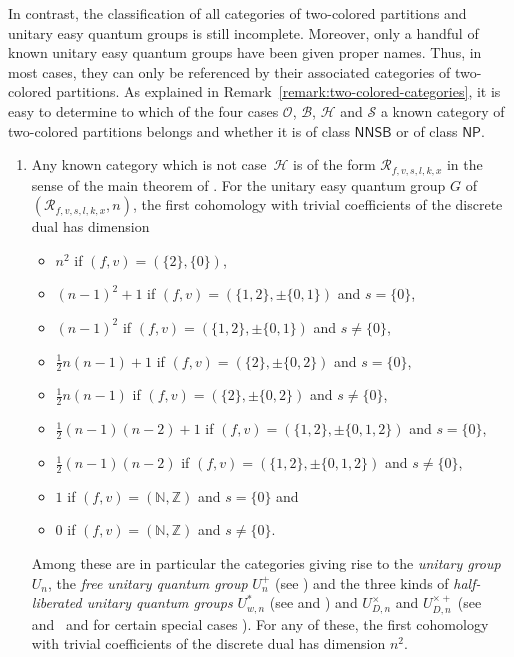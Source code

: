 \documentclass[10pt,a4paper]{amsart}
\numberwithin{equation}{section}
\newcommand{\pint}{\mathbb{N}}
\newcommand{\integers}{\mathbb{Z}}
\newcommand{\ueqgU}[1]{U_{#1}}
\newcommand{\ueqgUplus}[1]{U^{+}_{#1}}
\newcommand{\ueqgUstar}[2]{U^{\ast}_{#1,#2}}
\newcommand{\ueqgUtimes}[2]{U^{\times}_{#1,#2}}
\newcommand{\ueqgUtimesplus}[2]{U^{{\times}{+}}_{#1,#2}}
\newcommand{\thedim}{n}
\newcommand{\theqg}{G}
\newcommand{\onlyneutralnonsingletonblocks}{\mathsf{NNSB}}
\newcommand{\onlyneutralpartitions}{\mathsf{NP}}
\begin{document}
    \begin{Remark}
      In contrast, the classification of all categories of two-colored partitions and unitary easy quantum groups is still incomplete. Moreover, only a handful of known unitary easy quantum groups have been given proper names. Thus, in most cases, they can only be referenced by their associated categories of two-colored partitions.  As explained in Remark~\ref{remark:two-colored-categories}, it is easy to determine to which of the four cases $\mathcal{O}$, $\mathcal{B}$, $\mathcal{H}$ and $\mathcal{S}$ a known category of two-colored partitions belongs and whether it is of class $\onlyneutralnonsingletonblocks$ or of class $\onlyneutralpartitions$.
      \begin{enumerate}
      \item Any known category which is not case~$\mathcal{H}$ is of the form $\mathcal{R}_{f,v,s,l,k,x}$ in the sense of the main theorem of \cite{MangWeber2021b}. For the unitary easy quantum group $\theqg$ of $(\mathcal{R}_{f,v,s,l,k,x},\thedim)$, the first cohomology with trivial coefficients of the discrete dual has dimension
        \begin{itemize}\itemsep=1pt
        \item  $\thedim^2$ if $(f,v)=(\{2\},\{0\})$,
        \item $(\thedim-1)^2+1$ if $(f,v)=(\{1,2\},\pm\{0,1\})$ and $s=\{0\}$,
        \item $(\thedim-1)^2$ if $(f,v)=(\{1,2\},\pm\{0,1\})$ and $s\neq\{0\}$,
        \item $\frac{1}{2}\thedim(\thedim-1)+1$ if $(f,v)=(\{2\},\pm\{0,2\})$ and $s= \{0\}$,
        \item $\frac{1}{2}\thedim(\thedim-1)$ if $(f,v)=(\{2\},\pm\{0,2\})$ and $s\neq \{0\}$,
        \item $\frac{1}{2}(\thedim-1)(\thedim-2)+1$ if $(f,v)=(\{1,2\},\pm\{0,1,2\})$ and $s=\{0\}$,
        \item $\frac{1}{2}(\thedim-1)(\thedim-2)$ if $(f,v)=(\{1,2\},\pm\{0,1,2\})$ and $s\neq \{0\}$,
        \item $1$ if $(f,v)=(\pint,\integers)$ and $s=\{0\}$ and
        \item $0$ if $(f,v)=(\pint,\integers)$ and $s\neq \{0\}$.
        \end{itemize}
Among these are in particular the categories giving rise to the \emph{unitary group} $\ueqgU{\thedim}$, the  \emph{free unitary quantum group} $\ueqgUplus{\thedim}$ (see \cite{VanDaeleWang1996a, Wang1995b}) and the three kinds of \emph{half-liberated unitary quantum groups} $\ueqgUstar{w}{\thedim}$ (see \cite{BanicaBichon2017a,BanicaBichon2017b,MangWeber2020} and \cite[Chapter~3]{Mang2022}) and $\ueqgUtimes{D}{\thedim}$ and $\ueqgUtimesplus{D}{\thedim}$ (see \cite{MangWeber2021a} and~\cite[Chapter~3]{Mang2022} and for certain special cases \cite{BanicaBichon2017a,BhowmickDAndreaDasDabrowski2014, BhowmickDAndreaDabrowski2011}). For any of these, the first cohomology with trivial coefficients of the discrete dual has dimension $\thedim^2$.

\end{enumerate}
\end{Remark}
\end{document}
